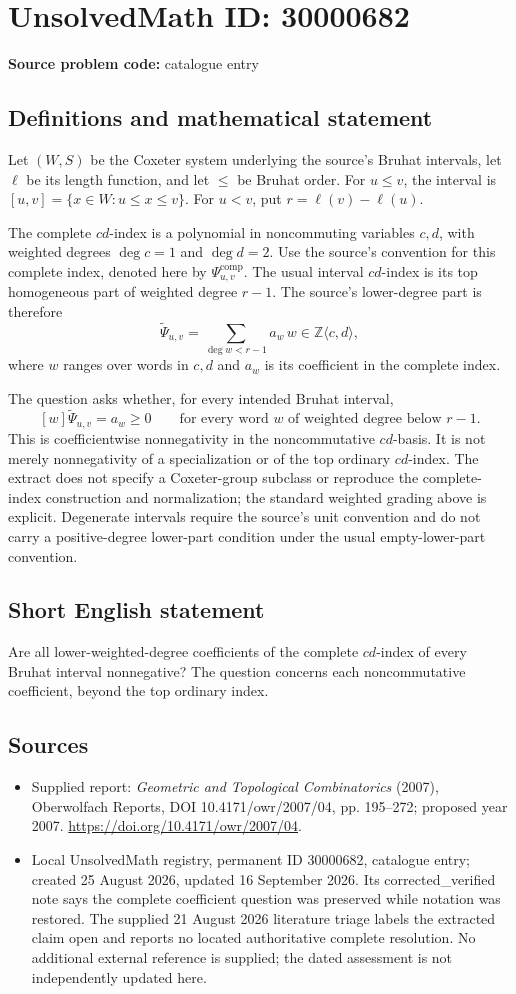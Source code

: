 \documentclass[11pt]{article}
\newcommand{\Z}{\mathbb{Z}}
\begin{document}
\section*{UnsolvedMath ID: 30000682}
\textbf{Source problem code:} catalogue entry
\subsection{Definitions and mathematical statement}
Let $(W,S)$ be the Coxeter system underlying the source's Bruhat intervals, let $\ell$ be its length function, and let $\leq$ be Bruhat order. For $u\leq v$, the interval is $[u,v]=\{x\in W:u\leq x\leq v\}$. For $u<v$, put $r=\ell(v)-\ell(u)$.

The complete $cd$-index is a polynomial in noncommuting variables $c,d$, with weighted degrees $\deg c=1$ and $\deg d=2$. Use the source's convention for this complete index, denoted here by $\Psi^{\mathrm{comp}}_{u,v}$. The usual interval $cd$-index is its top homogeneous part of weighted degree $r-1$. The source's lower-degree part is therefore
\[
\widetilde\Psi_{u,v}
=\sum_{\deg w<r-1}a_w\,w\in\Z\langle c,d\rangle,
\]
where $w$ ranges over words in $c,d$ and $a_w$ is its coefficient in the complete index.

The question asks whether, for every intended Bruhat interval,
\[
[w]\widetilde\Psi_{u,v}=a_w\geq0
\qquad\text{for every word }w\text{ of weighted degree below }r-1.
\]
This is coefficientwise nonnegativity in the noncommutative $cd$-basis. It is not merely nonnegativity of a specialization or of the top ordinary $cd$-index. The extract does not specify a Coxeter-group subclass or reproduce the complete-index construction and normalization; the standard weighted grading above is explicit. Degenerate intervals require the source's unit convention and do not carry a positive-degree lower-part condition under the usual empty-lower-part convention.
\subsection{Short English statement}
Are all lower-weighted-degree coefficients of the complete $cd$-index of every Bruhat interval nonnegative? The question concerns each noncommutative coefficient, beyond the top ordinary index.
\subsection{Sources}
\begin{itemize}
\item Supplied report: \emph{Geometric and Topological Combinatorics} (2007), Oberwolfach Reports, DOI 10.4171/owr/2007/04, pp. 195--272; proposed year 2007. \url{https://doi.org/10.4171/owr/2007/04}.
\item Local UnsolvedMath registry, permanent ID 30000682, catalogue entry; created 25 August 2026, updated 16 September 2026. Its corrected\_verified note says the complete coefficient question was preserved while notation was restored. The supplied 21 August 2026 literature triage labels the extracted claim open and reports no located authoritative complete resolution. No additional external reference is supplied; the dated assessment is not independently updated here.
\end{itemize}
\end{document}
